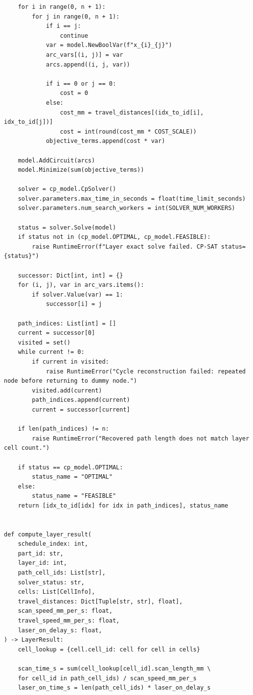 \documentclass[a4paper, 12pt]{ctexart}
\begin{document}
\begin{verbatim}
    for i in range(0, n + 1):
        for j in range(0, n + 1):
            if i == j:
                continue
            var = model.NewBoolVar(f"x_{i}_{j}")
            arc_vars[(i, j)] = var
            arcs.append((i, j, var))

            if i == 0 or j == 0:
                cost = 0
            else:
                cost_mm = travel_distances[(idx_to_id[i], idx_to_id[j])]
                cost = int(round(cost_mm * COST_SCALE))
            objective_terms.append(cost * var)

    model.AddCircuit(arcs)
    model.Minimize(sum(objective_terms))

    solver = cp_model.CpSolver()
    solver.parameters.max_time_in_seconds = float(time_limit_seconds)
    solver.parameters.num_search_workers = int(SOLVER_NUM_WORKERS)

    status = solver.Solve(model)
    if status not in (cp_model.OPTIMAL, cp_model.FEASIBLE):
        raise RuntimeError(f"Layer exact solve failed. CP-SAT status={status}")

    successor: Dict[int, int] = {}
    for (i, j), var in arc_vars.items():
        if solver.Value(var) == 1:
            successor[i] = j

    path_indices: List[int] = []
    current = successor[0]
    visited = set()
    while current != 0:
        if current in visited:
            raise RuntimeError("Cycle reconstruction failed: repeated node before returning to dummy node.")
        visited.add(current)
        path_indices.append(current)
        current = successor[current]

    if len(path_indices) != n:
        raise RuntimeError("Recovered path length does not match layer cell count.")

    if status == cp_model.OPTIMAL:
        status_name = "OPTIMAL"
    else:
        status_name = "FEASIBLE"
    return [idx_to_id[idx] for idx in path_indices], status_name


def compute_layer_result(
    schedule_index: int,
    part_id: str,
    layer_id: int,
    path_cell_ids: List[str],
    solver_status: str,
    cells: List[CellInfo],
    travel_distances: Dict[Tuple[str, str], float],
    scan_speed_mm_per_s: float,
    travel_speed_mm_per_s: float,
    laser_on_delay_s: float,
) -> LayerResult:
    cell_lookup = {cell.cell_id: cell for cell in cells}

    scan_time_s = sum(cell_lookup[cell_id].scan_length_mm \
    for cell_id in path_cell_ids) / scan_speed_mm_per_s
    laser_on_time_s = len(path_cell_ids) * laser_on_delay_s


\end{verbatim}
\end{document}
